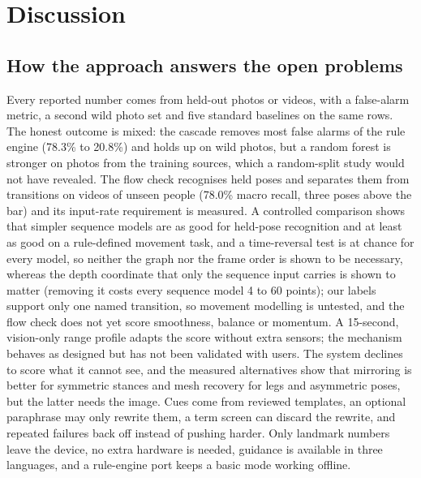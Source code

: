 \section{Discussion}\label{sec:discussion}
\subsection{How the approach answers the open problems}
 Every reported number comes from held-out photos or videos, with a false-alarm metric, a second wild photo set and five standard baselines on the same rows. The honest outcome is mixed: the cascade removes most false alarms of the rule engine (78.3\% to 20.8\%) and holds up on wild photos, but a random forest is stronger on photos from the training sources, which a random-split study would not have revealed.
 The flow check recognises held poses and separates them from transitions on videos of unseen people (78.0\% macro recall, three poses above the bar) and its input-rate requirement is measured. A controlled comparison shows that simpler sequence models are as good for held-pose recognition and at least as good on a rule-defined movement task, and a time-reversal test is at chance for every model, so neither the graph nor the frame order is shown to be necessary, whereas the depth coordinate that only the sequence input carries is shown to matter (removing it costs every sequence model 4 to 60 points); our labels support only one named transition, so movement modelling is untested, and the flow check does not yet score smoothness, balance or momentum.
 A 15-second, vision-only range profile adapts the score without extra sensors; the mechanism behaves as designed but has not been validated with users.
 The system declines to score what it cannot see, and the measured alternatives show that mirroring is better for symmetric stances and mesh recovery for legs and asymmetric poses, but the latter needs the image.
 Cues come from reviewed templates, an optional paraphrase may only rewrite them, a term screen can discard the rewrite, and repeated failures back off instead of pushing harder.
 Only landmark numbers leave the device, no extra hardware is needed, guidance is available in three languages, and a rule-engine port keeps a basic mode working offline.

